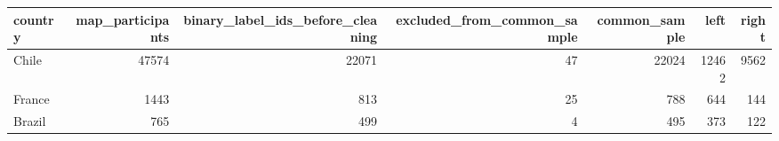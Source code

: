 \begin{tabular}{lrrrrrr}
\toprule
country & map_participants & binary_label_ids_before_cleaning & excluded_from_common_sample & common_sample & left & right \\
\midrule
Chile & 47574 & 22071 & 47 & 22024 & 12462 & 9562 \\
France & 1443 & 813 & 25 & 788 & 644 & 144 \\
Brazil & 765 & 499 & 4 & 495 & 373 & 122 \\
\bottomrule
\end{tabular}
